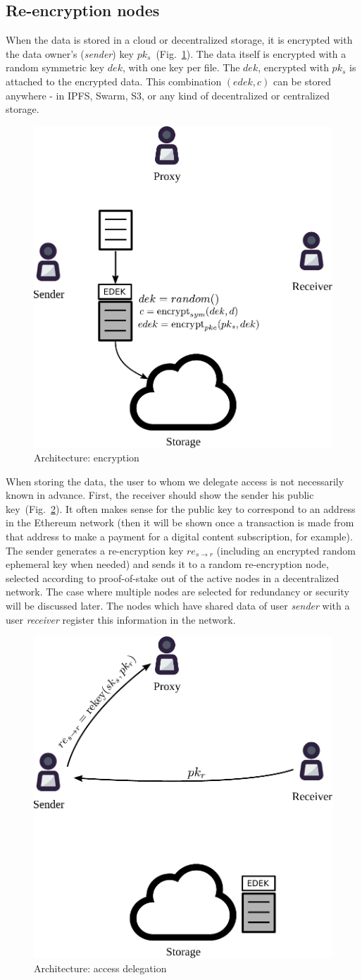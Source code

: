 \documentclass[longbibliography,nofootinbib]{revtex4-1}
\newcommand{\figref}[1]{Fig.~\ref{#1}}
\begin{document}
\subsection{Re-encryption nodes}

When the data is stored in a cloud or decentralized storage, it is encrypted with the data owner's (\emph{sender}) key $pk_s$~(\figref{fig:arch-encrypt}).
The data itself is encrypted with a random symmetric key $dek$, with one key per file.
The $dek$, encrypted with $pk_s$ is attached to the encrypted data.
This combination $(edek, c)$ can be stored anywhere - in IPFS, Swarm, S3, or any kind of decentralized or centralized storage.
\begin{figure}
\centering
    \includegraphics[width=0.4\columnwidth]{pdf/encrypt.pdf}
    \caption{Architecture: encryption}
    \label{fig:arch-encrypt}
\end{figure}

When storing the data, the user to whom we delegate access is not necessarily known in advance.
First, the receiver should show the sender his public key~(\figref{fig:arch-delegate}).
It often makes sense for the public key to correspond to an address in the Ethereum network (then it will be shown once a transaction is made from that
address to make a payment for a digital content subscription, for example).
The sender generates a re-encryption key $re_{s\rightarrow r}$ (including an encrypted random ephemeral key when needed) and sends it to a random re-encryption
node, selected according to proof-of-stake out of the active nodes in a decentralized network.
The case where multiple nodes are selected for redundancy or security will be discussed later.
The nodes which have shared data of user \emph{sender} with a user \emph{receiver} register this information in the network.
\begin{figure}
\centering
    \includegraphics[width=0.4\columnwidth]{pdf/delegate.pdf}
    \caption{Architecture: access delegation}
    \label{fig:arch-delegate}
\end{figure}
\end{document}
